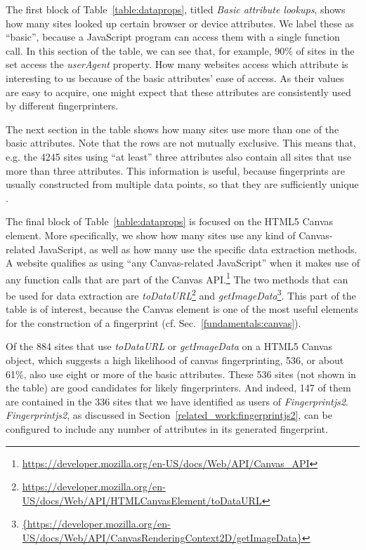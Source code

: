 \documentclass[
    fontsize=12pt,
    headings=small,
    parskip=half,
    bibliography=totoc,
    numbers=noenddot,
    open=any
    ]{scrreprt}
\begin{document}
The first block of Table~\ref{table:dataprops}, titled \textit{Basic attribute lookups},
shows how many sites looked up certain browser or device attributes.
We label these as ``basic'', because a JavaScript program can access them with a single function
call. In this section of the table, we can see that, for example, 90\% of sites in the set access the
\textit{userAgent} property.
How many websites access which attribute is interesting to us because of the basic attributes' ease of access.
As their values are easy to acquire, one might expect that these attributes are consistently used by different fingerprinters.

The next section in the table shows how many sites use more than one of the basic attributes.
Note that the rows are not mutually exclusive. This means that, e.g. the 4245 sites using ``at least'' three
attributes also contain all sites that use more than three attributes.
This information is useful, because fingerprints are usually constructed from
multiple data points, so that they are sufficiently unique \cite{panopticlick}.

The final block of Table~\ref{table:dataprops} is focused on the HTML5 Canvas element.
More specifically, we show how many sites use any kind of Canvas-related JavaScript,
as well as how many use the specific data extraction methods.
A website qualifies as using ``any Canvas-related JavaScript'' when it makes use
of any function calls that are part of the Canvas API.\footnote{\url{https://developer.mozilla.org/en-US/docs/Web/API/Canvas_API}}
The two methods that can be used for data extraction are
\textit{toDataURL}\footnote{\url{https://developer.mozilla.org/en-US/docs/Web/API/HTMLCanvasElement/toDataURL}}
and
\textit{getImageData}\footnote{\url{{https://developer.mozilla.org/en-US/docs/Web/API/CanvasRenderingContext2D/getImageData}}}.
This part of the table is of interest, because the Canvas element is one of the
most useful elements for the construction of a fingerprint (cf. Sec.~\ref{fundamentals:canvas}).

Of the 884 sites that use \textit{toDataURL} or \textit{getImageData} on a HTML5 Canvas object, which suggests
a high likelihood of canvas fingerprinting, 536, or about 61\%, also use eight or more of the basic attributes.
These 536 sites (not shown in the table) are good candidates for likely fingerprinters.
And indeed, 147 of them are contained in the 336 sites that we have identified as users of \textit{Fingerprintjs2}.
\textit{Fingerprintjs2}, as discussed in Section~\ref{related_work:fingerprintjs2},
can be configured to include any number of attributes
in its generated fingerprint.
\end{document}
